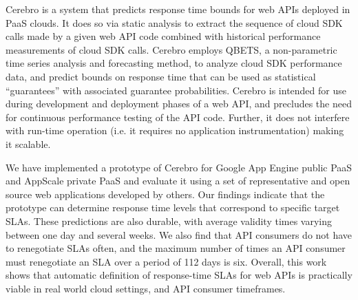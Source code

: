 
Cerebro is a system that predicts response time 
bounds for web APIs deployed in PaaS clouds.  It does so via 
static analysis to extract the sequence of cloud SDK 
calls made by a given web API code combined with
historical performance measurements of cloud SDK calls. 
Cerebro employs QBETS, a non-parametric time series analysis and 
forecasting method, to analyze
cloud SDK performance data, and predict bounds
on response time that can be used as statistical ``guarantees'' with
associated guarantee probabilities.
Cerebro is intended for use during development and 
deployment phases of a web API, and 
precludes the need for continuous performance testing of the API code. 
Further, it does not interfere with run-time operation (i.e. it requires
no application instrumentation) making it scalable.

We have implemented a prototype of Cerebro for Google App Engine public PaaS
and AppScale private PaaS
and evaluate it using a set of representative
and open source web applications developed by others.  
Our findings indicate that the prototype can determine response time levels
that correspond to specific target SLAs.  These predictions are also durable,
with average validity times varying between one day and several weeks.
We also find that API consumers do not have to renegotiate SLAs often, and the maximum
number of times an API consumer must renegotiate an SLA over a period of 112 days is six.
Overall, this work shows that automatic definition of response-time SLAs for web APIs is practically
viable in real world cloud settings, and API consumer timeframes.

